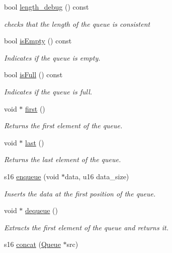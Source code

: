 \begin{DoxyCompactItemize}
bool \hyperlink{class_queue_a3d8fda7e63d8cf4117cdf1cdc1a144c1}{length\+\_\+debug} () const
\begin{DoxyCompactList}\small\item\em checks that the length of the queue is consistent \end{DoxyCompactList}\item 
bool \hyperlink{class_queue_a7614672eed4a720bf0d78d94002bd022}{is\+Empty} () const
\begin{DoxyCompactList}\small\item\em Indicates if the queue is empty. \end{DoxyCompactList}\item 
bool \hyperlink{class_queue_a20268d0ce4bb6b9f9a98ad77d30a5a18}{is\+Full} () const
\begin{DoxyCompactList}\small\item\em Indicates if the queue is full. \end{DoxyCompactList}\item 
void $\ast$ \hyperlink{class_queue_ac416befe32e427c4367d3807b283858a}{first} ()
\begin{DoxyCompactList}\small\item\em Returns the first element of the queue. \end{DoxyCompactList}\item 
void $\ast$ \hyperlink{class_queue_ae96cdb4a19e958f9c8ed6ee2175edacc}{last} ()
\begin{DoxyCompactList}\small\item\em Returns the last element of the queue. \end{DoxyCompactList}\item 
s16 \hyperlink{class_queue_a27a37b0757acf0a4eeee469dd3ab5af9}{enqueue} (void $\ast$data, u16 data\+\_\+size)
\begin{DoxyCompactList}\small\item\em Inserts the data at the first position of the queue. \end{DoxyCompactList}\item 
void $\ast$ \hyperlink{class_queue_a30c82e655d4420c27ef5e4ce17fa99e8}{dequeue} ()
\begin{DoxyCompactList}\small\item\em Extracts the first element of the queue and returns it. \end{DoxyCompactList}\item 
s16 \hyperlink{class_queue_aa7f9c30742af3cac04fe7ea26793e8ac}{concat} (\hyperlink{class_queue}{Queue} $\ast$src)

\end{DoxyCompactItemize}
